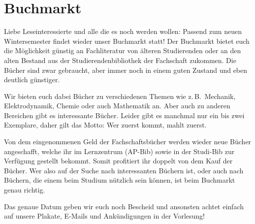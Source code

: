 \section{Buchmarkt}
\begin{multicols*}{2}
Liebe Leseinteressierte und alle die es noch werden wollen: Passend zum neuen Wintersemester findet wieder unser Buchmarkt statt! Der Buchmarkt bietet euch die Möglichkeit günstig an Fachliteratur von älteren Studierenden oder an den alten Bestand aus der Studierendenbibliothek der Fachschaft zukommen. Die Bücher sind zwar gebraucht, aber immer noch in einem guten Zustand und eben deutlich günstiger. 

Wir bieten euch dabei Bücher zu verschiedenen Themen wie z.\,B.\ Mechanik, Elektrodynamik, Chemie oder auch Mathematik an. Aber auch zu anderen Bereichen gibt es interessante Bücher. Leider gibt es manchmal nur ein bis zwei Exemplare, daher gilt das Motto: Wer zuerst kommt, mahlt zuerst. 

Von dem eingenommenen Geld der Fachschaftsbücher werden wieder neue Bücher angeschafft, welche ihr im Lernzentrum (AP-Bib) sowie in der Studi-Bib zur Verfügung gestellt bekommt. Somit profitiert ihr doppelt von dem Kauf der Bücher. Wer also auf der Suche nach interessanten Büchern ist, oder auch nach Büchern, die einem beim Studium nützlich sein können, ist beim Buchmarkt genau richtig.

Das genaue Datum geben wir euch noch Bescheid und ansonsten achtet einfach auf unsere Plakate, E-Mails und Ankündigungen in der Vorlesung!

\end{multicols*}
